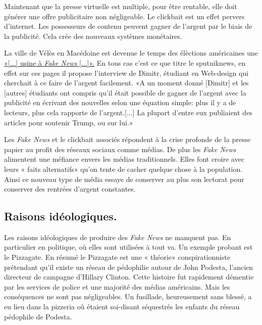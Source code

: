 \documentclass[11pt,a4paper,oldfontcommands]{memoir}
\begin{document}
Maintenant que la presse virtuelle est multiple, pour être rentable, elle doit générer une offre publicitaire non négligeable.
Le clickbait est un effet pervers d'internet.
Les possesseurs de contenu peuvent gagner de l'argent par le biais de la publicité.
Cela crée des nouveaux systèmes monétaires.

La ville de Vélès en Macédoine est devenue  le temps des élèctions américaines une \href{https://fr.sputniknews.com/international/201709251033204687-macedoine-veles-fake-news-trump/}{«[...] usine à \textit{Fake News} [...]».} En tous cas c'est ce que titre le sputniknews, en effet sur ces pages il propose l'interview de Dimitr, étudiant en Web-design qui cherchait à ce faire de l'argent facilement. «A un moment donné [Dimitr] et les [autres] étudiants ont compris qu'il était possible de gagner de l'argent avec la publicité en écrivant des nouvelles selon une équation simple: plus il y a de lecteurs, plus cela rapporte de l'argent.[...] La plupart d'entre eux publiaient des articles pour soutenir Trump, ou sur lui.»

Les \textit{Fake News} et le clickbait associés répondent à la crise profonde de la presse papier au profit des réseaux sociaux comme médias.
De plus les \textit{Fake News} alimentent une méfiance envers les médias traditionnels.
Elles font croire avec leurs « faits alternatifs» qu'on tente de cacher quelque chose à la population.
Ainsi ce nouveau type de média essaye de conserver au plus son lectorat pour conserver des rentrées d'argent constantes.

\subsection{Raisons idéologiques.}
Les raisons idéologiques de produire des \textit{Fake News} ne manquent pas.
En particulier en politique, où elles sont utilisées à tout va.
Un exemple probant est le Pizzagate.
En résumé le Pizzagate est une « théorie» conspirationniste prétendant qu'il existe un réseau de pédophilie autour de John Podesta, l'ancien directeur de campagne d'Hillary Clinton.
Cette histoire fut rapidement démentie par les services de police et une majorité des médias américains. Mais les conséquences ne sont pas négligeables.
Un fusillade, heureusement sans blessé, a eu lieu dans la pizzeria où étaient soi-disant séquestrés les enfants du réseau pédophile de Podesta.
\end{document}

